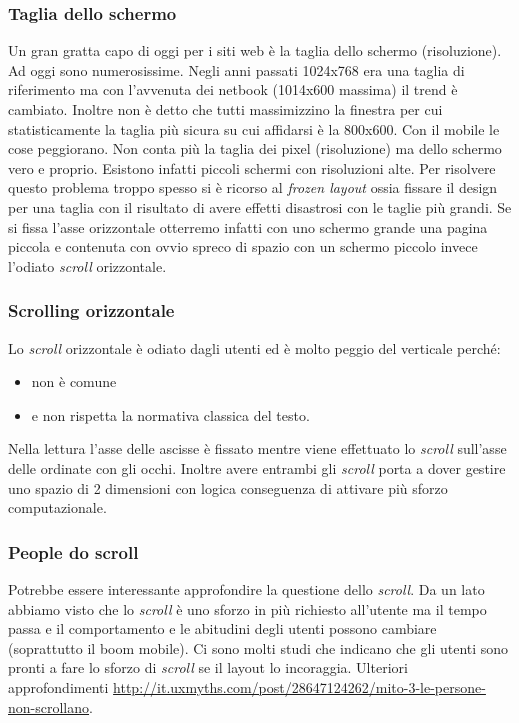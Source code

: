 			\subsubsection{Taglia dello schermo}
				Un gran gratta capo di oggi per i siti web è la taglia dello schermo (risoluzione). Ad oggi sono numerosissime. Negli anni passati 1024x768 era una taglia di riferimento ma con l'avvenuta dei netbook (1014x600 massima) il trend è cambiato. Inoltre non è detto che tutti massimizzino la finestra per cui statisticamente la taglia più sicura su cui affidarsi è la 800x600. Con il mobile le cose peggiorano. Non conta più la taglia dei pixel (risoluzione) ma dello schermo vero e proprio. Esistono infatti piccoli schermi con risoluzioni alte.
				Per risolvere questo problema troppo spesso si è ricorso al \emph{frozen layout} ossia fissare il design per una taglia con il risultato di avere effetti disastrosi con le taglie più grandi. Se si fissa l'asse orizzontale otterremo infatti con uno schermo grande una pagina piccola e contenuta con ovvio spreco di spazio con un schermo piccolo invece l'odiato \emph{scroll} orizzontale.
				
			\subsubsection{Scrolling orizzontale}
				Lo \emph{scroll} orizzontale è odiato dagli utenti ed è molto peggio del verticale perché:
				\begin{itemize}
					\item non è comune
					\item e non rispetta la normativa classica del testo.	
				\end{itemize}
				Nella lettura l'asse delle ascisse è fissato mentre viene effettuato lo \emph{scroll} sull'asse delle ordinate con gli occhi. Inoltre avere entrambi gli \emph{scroll} porta a dover gestire uno spazio di 2 dimensioni con logica conseguenza di attivare più sforzo computazionale.
			
			\subsubsection{People do scroll}
				Potrebbe essere interessante approfondire la questione dello \emph{scroll}. Da un lato abbiamo visto che lo \emph{scroll} è uno sforzo in più richiesto all'utente ma il tempo passa e il comportamento e le abitudini degli utenti possono cambiare (soprattutto il boom mobile). Ci sono molti studi che indicano che gli utenti sono pronti a fare lo sforzo di \emph{scroll} se il layout lo incoraggia. Ulteriori approfondimenti \url{http://it.uxmyths.com/post/28647124262/mito-3-le-persone-non-scrollano}.
				
